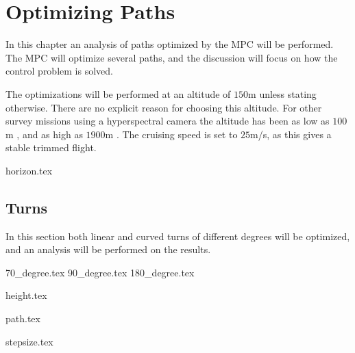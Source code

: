 \chapter{Optimizing Paths}


In this chapter an analysis of paths optimized by the MPC will be performed. The MPC will optimize several paths, and the discussion will focus on how the control problem is solved.

The optimizations will be performed at an altitude of $150$m unless stating otherwise. There are no explicit reason for choosing this altitude. For other survey missions using a hyperspectral camera the altitude has been as low as $100$m \cite{hymsySUOMALAINEN}, and as high as $1900$m \cite{mosaicASMAT}. The cruising speed is set to $25$m/s, as this gives a stable trimmed flight.


{horizon.tex}

\section{Turns}

In this section both linear and curved turns of different degrees will be optimized, and an analysis will be performed on the results.

{70_degree.tex}
{90_degree.tex}
{180_degree.tex}	

{height.tex}

{path.tex}

{stepsize.tex}